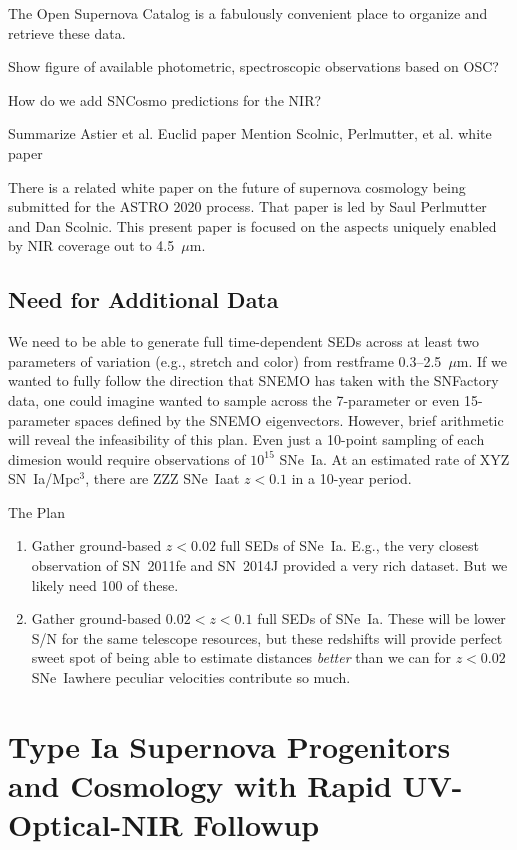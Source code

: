 \documentclass{aastex}
\newcommand{\snia}{SN~Ia}
\newcommand{\sneia}{SNe~Ia}
\newcommand{\tbd}{{\color{red}}}
\begin{document}
The Open Supernova Catalog \citep{Guillochon17} is a fabulously convenient place to organize and retrieve these data.

{\tbd Show figure of available photometric, spectroscopic observations based on OSC?}

{\tbd How do we add SNCosmo predictions for the NIR?}


{\tbd Summarize Astier et al. Euclid paper}
{\tbd Mention Scolnic, Perlmutter, et al. white paper}

There is a related white paper on the future of supernova cosmology being submitted for the ASTRO 2020 process.  That paper is led by Saul Perlmutter and Dan Scolnic.  This present paper is focused on the aspects uniquely enabled by NIR coverage out to 4.5~$\mu$m.

\subsection{Need for Additional Data}

We need to be able to generate full time-dependent SEDs across at least two parameters of variation (e.g., stretch and color) from restframe 0.3--2.5~$\mu$m.  If we wanted to fully follow the direction that SNEMO has taken with the SNFactory data, one could imagine wanted to sample across the 7-parameter or even 15-parameter spaces defined by the SNEMO eigenvectors.  However, brief arithmetic will reveal the infeasibility of this plan.  Even just a 10-point sampling of each dimesion would require observations of $10^{15}$ \sneia.  At an estimated rate of XYZ \snia/Mpc$^{3}$, there are ZZZ \sneia at $z<0.1$ in a 10-year period.

The Plan
\begin{enumerate}
    \item Gather ground-based $z<0.02$ full SEDs of \sneia.  E.g., the very closest observation of SN~2011fe and SN~2014J provided a very rich dataset.  But we likely need 100 of these.
    \item Gather ground-based $0.02<z<0.1$ full SEDs of \sneia.  These will be lower S/N for the same telescope resources, but these redshifts will provide perfect sweet spot of being able to estimate distances {\em better} than we can for $z<0.02$ \sneia where peculiar velocities contribute so much.
\end{enumerate}

\section{Type Ia Supernova Progenitors and Cosmology with Rapid UV-Optical-NIR Followup}
\end{document}
